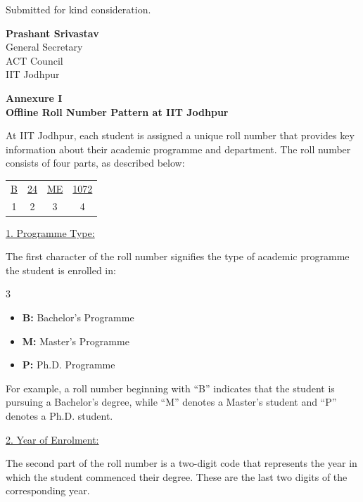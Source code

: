 \documentclass[11pt,a4paper]{article}
\newcommand{\GSname}{Prashant Srivastav}
\newcommand{\rpart}[1]{\par\medskip\underline{#1}\par}
\begin{document}
\vspace{8pt}
Submitted for kind consideration.

\vspace{1.8cm}
{\bfseries \GSname}\\
General Secretary\\
ACT Council\\
IIT Jodhpur

\newpage
\begin{center}
{\large\bfseries Annexure I}\\[4pt]
{\bfseries Offline Roll Number Pattern at IIT Jodhpur}
\end{center}
\setlength{\parskip}{3pt}\renewcommand{\rpart}[1]{\par\smallskip\underline{#1}\par}

At IIT Jodhpur, each student is assigned a unique roll number that provides key information about their academic programme and department. The roll number consists of four parts, as described below:

\begin{center}
\renewcommand{\arraystretch}{1.1}
\begin{tabular}{cccc}
  {\LARGE\underline{B}} & {\LARGE\underline{24}} & {\LARGE\underline{ME}} & {\LARGE\underline{1072}} \\[2pt]
  \small 1 & \small 2 & \small 3 & \small 4
\end{tabular}
\end{center}

\rpart{1. Programme Type:}
The first character of the roll number signifies the type of academic programme the student is enrolled in:
\begin{multicols}{3}
\begin{itemize}
  \item \textbf{B:} Bachelor's Programme
  \item \textbf{M:} Master's Programme
  \item \textbf{P:} Ph.D. Programme
\end{itemize}
\end{multicols}
For example, a roll number beginning with ``B'' indicates that the student is pursuing a Bachelor's degree, while ``M'' denotes a Master's student and ``P'' denotes a Ph.D. student.

\rpart{2. Year of Enrolment:}
The second part of the roll number is a two-digit code that represents the year in which the student commenced their degree. These are the last two digits of the corresponding year.
\end{document}
